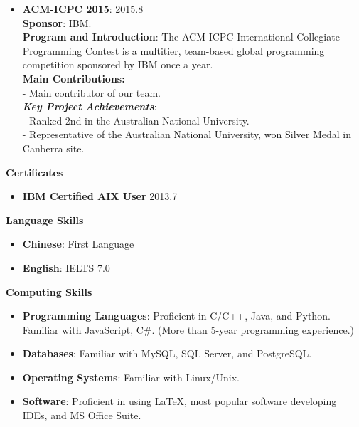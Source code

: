 \documentclass{res}
\newcommand{\resheading}[1]{{\normalsize \colorbox{mygrey}{\begin{minipage}{\textwidth}{\textbf{#1 \vphantom{p\^{E}}}}\end{minipage}}}}
\begin{document}
\begin{resume}
\begin{CJK*}{UTF8}{song}
\begin{itemize}
  \item{\bf ACM-ICPC 2015}: \hfill 2015.8 \vspace{3pt} \\
  		\textbf{Sponsor}: IBM. \vspace{3pt} \\
		\textbf{Program and Introduction}: The ACM-ICPC International Collegiate Programming Contest is a multitier, team-based global programming competition sponsored by IBM once a year. \vspace{3pt} \\
		\textbf{Main Contributions:} \vspace{3pt} \\
		- Main contributor of our team. \vspace{3pt} \\
		\textit{\textbf{Key Project Achievements}}: \vspace{3pt} \\
		- Ranked 2nd in the Australian National University. \\
		- Representative of the Australian National University, won Silver Medal in Canberra site.
			
\end{itemize}



\resheading{Certificates}

\begin{itemize}
\itemsep -2pt %
  \item{\bf IBM Certified AIX User} \hfill 2013.7
\end{itemize}



\resheading{Language Skills}

\begin{itemize}
\itemsep -2pt %
  \item{\bf Chinese}: First Language	
  \item{\bf English}: IELTS 7.0
\end{itemize}



\resheading{Computing Skills}

\begin{itemize}
\itemsep -2pt %
  \item{\bf Programming Languages}: Proficient in C/C++, Java, and Python. Familiar with JavaScript, C\#. (More than 5-year programming experience.)
  \item{\bf Databases}: Familiar with MySQL, SQL Server, and PostgreSQL.
  \item{\bf Operating Systems}: Familiar with Linux/Unix.
  \item{\bf Software}: Proficient in using \LaTeX, most popular software developing IDEs, and MS Office Suite.
\end{itemize}



\end{CJK*}
\end{resume}
\end{document}
